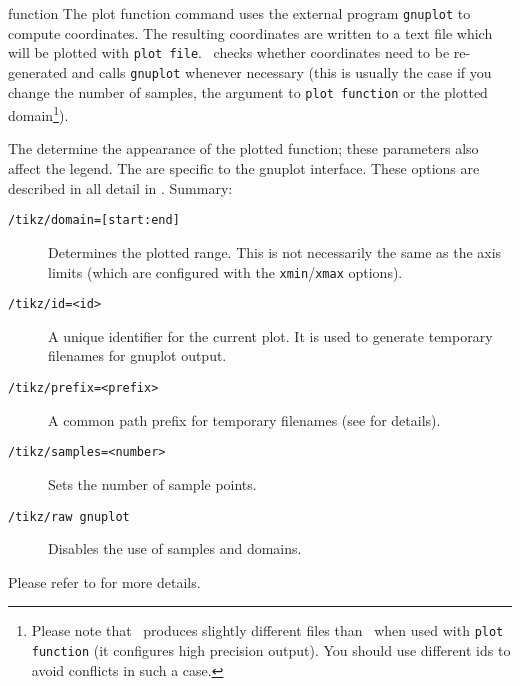 \begin{addplotoperation}[noindex]{function}{}
The plot function command uses the external program \texttt{gnuplot} to compute coordinates. The resulting coordinates are written to a text file which will be plotted with \texttt{plot file}. \PGF\ checks whether coordinates need to be re-generated and calls \texttt{gnuplot} whenever necessary (this is usually the case if you change the number of samples, the argument to \texttt{plot function} or the plotted domain\footnote{Please note that \PGFPlots\ produces slightly different files than \Tikz\ when used with \texttt{plot function} (it configures high precision output). You should use different ids to avoid conflicts in such a case.}).

The  determine the appearance of the plotted function; these parameters also affect the legend. The  are specific to the gnuplot interface. These options are described in all detail in \cite[section~18.6]{tikz}. Summary:
\begin{description}
\item[\texttt{/tikz/domain=[start:end]}] Determines the plotted range. This is not necessarily the same as the axis limits (which are configured with the \texttt{xmin}/\texttt{xmax} options). 
\item[\texttt{/tikz/id=<id>}] A unique identifier for the current plot. It is used to generate temporary filenames for gnuplot output.
\item[\texttt{/tikz/prefix=<prefix>}] A common path prefix for temporary filenames (see \cite[section~18.6]{tikz} for details).
\item[\texttt{/tikz/samples=<number>}] Sets the number of sample points.
\item[\texttt{/tikz/raw gnuplot}] Disables the use of samples and domains.
\end{description}
\begin{codeexample}[]
\end{codeexample}
\begin{codeexample}[]
\end{codeexample}
Please refer to \cite[section~18.6]{tikz} for more details.
\end{addplotoperation}

